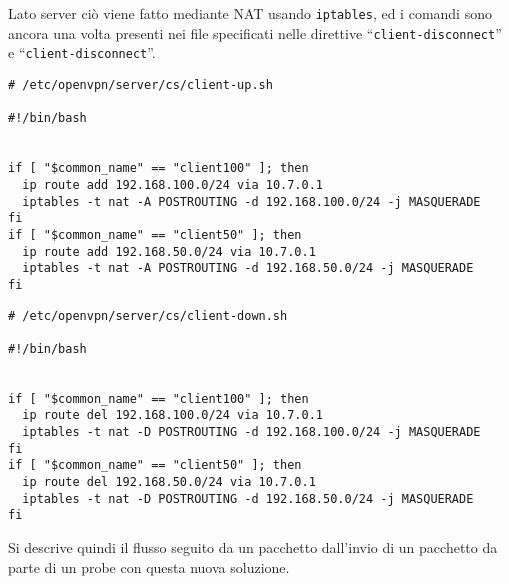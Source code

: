Lato server ciò viene fatto mediante
NAT usando \texttt{iptables}, ed i comandi sono ancora una volta presenti
nei file specificati nelle direttive ``\texttt{client-disconnect}'' e ``\texttt{client-disconnect}''.
\begin{verbatim}
# /etc/openvpn/server/cs/client-up.sh

#!/bin/bash


if [ "$common_name" == "client100" ]; then
  ip route add 192.168.100.0/24 via 10.7.0.1
  iptables -t nat -A POSTROUTING -d 192.168.100.0/24 -j MASQUERADE
fi
if [ "$common_name" == "client50" ]; then
  ip route add 192.168.50.0/24 via 10.7.0.1
  iptables -t nat -A POSTROUTING -d 192.168.50.0/24 -j MASQUERADE
fi
\end{verbatim}
\begin{verbatim}
# /etc/openvpn/server/cs/client-down.sh

#!/bin/bash


if [ "$common_name" == "client100" ]; then
  ip route del 192.168.100.0/24 via 10.7.0.1
  iptables -t nat -D POSTROUTING -d 192.168.100.0/24 -j MASQUERADE
fi
if [ "$common_name" == "client50" ]; then
  ip route del 192.168.50.0/24 via 10.7.0.1
  iptables -t nat -D POSTROUTING -d 192.168.50.0/24 -j MASQUERADE
fi
\end{verbatim}
Si descrive quindi il flusso
seguito da un pacchetto dall'invio di un pacchetto da parte di un probe con questa nuova
soluzione.
